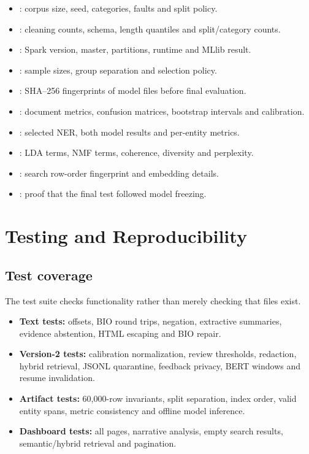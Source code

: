 \documentclass[12pt,a4paper]{report}
\begin{document}
\begin{itemize}
  \item {}: corpus size, seed, categories, faults and split policy.
  \item {}: cleaning counts, schema, length quantiles and split/category counts.
  \item {}: Spark version, master, partitions, runtime and MLlib result.
  \item {}: sample sizes, group separation and selection policy.
  \item {}: SHA--256 fingerprints of model files before final evaluation.
  \item {}: document metrics, confusion matrices, bootstrap intervals and calibration.
  \item {}: selected NER, both model results and per-entity metrics.
  \item {}: LDA terms, NMF terms, coherence, diversity and perplexity.
  \item {}: search row-order fingerprint and embedding details.
  \item {}: proof that the final test followed model freezing.
\end{itemize}

\chapter{Testing and Reproducibility}

\section{Test coverage}

The test suite checks functionality rather than merely checking that files exist.

\begin{itemize}
  \item \textbf{Text tests:} offsets, BIO round trips, negation, extractive summaries, evidence abstention, HTML escaping and BIO repair.
  \item \textbf{Version-2 tests:} calibration normalization, review thresholds, redaction, hybrid retrieval, JSONL quarantine, feedback privacy, BERT windows and resume invalidation.
  \item \textbf{Artifact tests:} 60,000-row invariants, split separation, index order, valid entity spans, metric consistency and offline model inference.
  \item \textbf{Dashboard tests:} all pages, narrative analysis, empty search results, semantic/hybrid retrieval and pagination.
\end{itemize}
\end{document}
